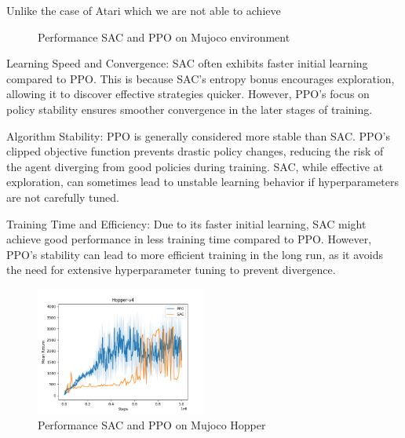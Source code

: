 \documentclass{article}
\begin{document}
Unlike the case of Atari which we are not able to achieve

\begin{figure}[h]
    \centering
    \caption{Performance SAC and PPO on Mujoco environment}
\end{figure}

Learning Speed and Convergence: SAC often exhibits faster initial learning
compared to PPO. This is because SAC's entropy bonus encourages exploration,
allowing it to discover effective strategies quicker. However, PPO's focus on
policy stability ensures smoother convergence in the later stages of training.

Algorithm Stability: PPO is generally considered more stable than SAC. PPO's
clipped objective function prevents drastic policy changes, reducing the risk
of the agent diverging from good policies during training. SAC, while effective
at exploration, can sometimes lead to unstable learning behavior if
hyperparameters are not carefully tuned.

Training Time and Efficiency: Due to its faster initial learning, SAC might
achieve good performance in less training time compared to PPO. However, PPO's
stability can lead to more efficient training in the long run, as it avoids the
need for extensive hyperparameter tuning to prevent divergence.

\begin{figure}[h]
    \centering
    \includegraphics[width=0.5\textwidth]{img/hopper.png}
    \caption{Performance SAC and PPO on Mujoco Hopper}
\end{figure}
\end{document}
